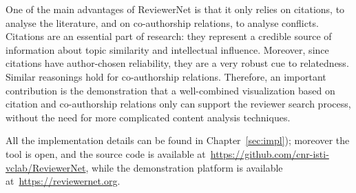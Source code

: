 One of the main advantages of ReviewerNet is that it only relies on citations, to analyse the literature, and on co-authorship relations, to analyse conflicts. Citations are an essential part of research: they represent a credible source of information about topic similarity and intellectual influence. Moreover, since citations have author-chosen reliability, they are a very robust cue to relatedness. Similar reasonings hold for co-authorship relations. Therefore, an important contribution is the demonstration that a well-combined visualization based on citation and co-authorship relations only can support the reviewer search process, without the need for more complicated content analysis techniques.  

All the implementation details can be found in Chapter~\ref{sec:impl}); moreover the tool is open, and the source code is available at~\url{https://github.com/cnr-isti-vclab/ReviewerNet}, while the demonstration platform is available at~\url{https://reviewernet.org}.  
